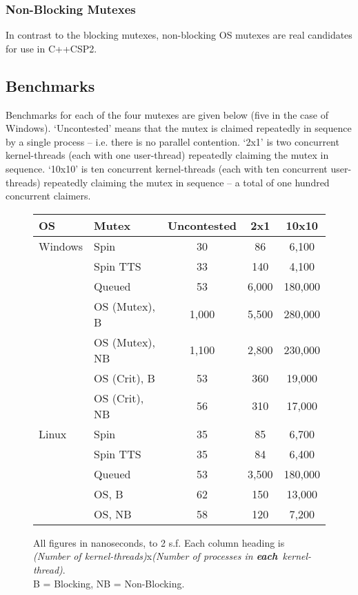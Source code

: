 \documentclass[12pt]{IOS-Book-Article-CPA-2007}
\begin{document}
\subsubsection{Non-Blocking Mutexes}

In contrast to the blocking mutexes, non-blocking OS mutexes are real candidates for use in C++CSP2.

\subsection{Benchmarks}

Benchmarks for each of the four mutexes are given below (five in the case of Windows).  `Uncontested' means that the mutex is claimed repeatedly in sequence
by a single process -- i.e. there is no parallel contention.  `2x1' is two concurrent kernel-threads (each with one user-thread) repeatedly claiming the mutex
in sequence.  `10x10' is ten concurrent kernel-threads (each with ten concurrent user-threads) repeatedly claiming the mutex in sequence -- a total of
one hundred concurrent claimers.

\begin{figure}[htb]

\begin{tabular}{ll|c|c|c}
OS & Mutex & Uncontested & 2x1 & 10x10 \\
\hline
Windows 
& Spin              & 30 & 86 & 6,100  \\
& Spin TTS          & 33 & 140 & 4,100 \\
& Queued               & 53 & 6,000 & 180,000 \\
& OS (Mutex), B        & 1,000 & 5,500 & 280,000 \\
& OS (Mutex), NB       & 1,100 & 2,800 & 230,000 \\
& OS (Crit), B         & 53 & 360 & 19,000 \\
& OS (Crit), NB        & 56 & 310 & 17,000 \\
\hline
Linux
& Spin           & 35 & 85 & 6,700 \\
& Spin TTS       & 35 & 84 & 6,400 \\
& Queued            & 53 & 3,500 & 180,000 \\
& OS, B             & 62 & 150 & 13,000 \\
& OS, NB            & 58 & 120 & 7,200 \\

\end{tabular}

All figures in nanoseconds, to 2 s.f. Each column heading is \\ \textit{(Number of kernel-threads)}x\textit{(Number of processes in \textbf{each}~kernel-thread)}.\\ B = Blocking, NB = Non-Blocking.

\end{figure}
\end{document}
